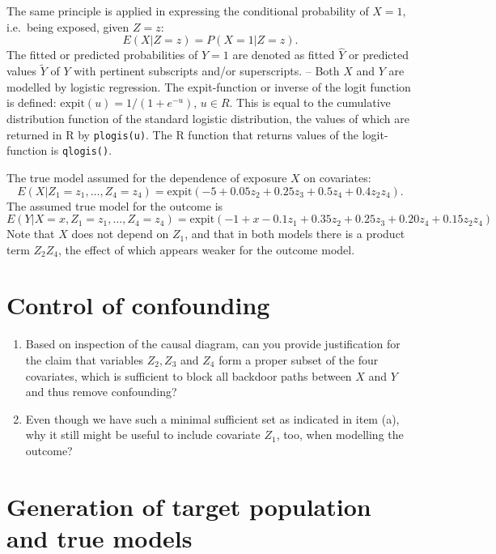 \documentclass[
]{book}
\begin{document}
The same principle is applied in expressing the conditional
probability of \(X=1\), i.e.~being exposed, given \(Z=z\):
\[ E(X|Z=z) = P(X=1|Z=z). \]
The fitted or predicted probabilities
of \(Y=1\) are denoted as fitted \(\widehat{Y}\) or predicted values
\(\widetilde{Y}\) of \(Y\) with pertinent subscripts and/or superscripts.
-- Both \(X\) and \(Y\) are modelled by logistic regression. The expit-function
or inverse of the logit function is defined:
\(\text{expit}(u) = 1/(1 + e^{-u})\), \(u\in R\). This is equal to the
cumulative distribution function of the standard logistic distribution,
the values of which are returned in R by \texttt{plogis(u)}. The R function
that returns values of the logit-function is \texttt{qlogis()}.

The true model assumed for the dependence of exposure \(X\) on covariates:
\[ E(X|Z_1 = z_1, \dots, Z_4 = z_4) =
      \text{expit}(-5 + 0.05z_2 + 0.25z_3 + 0.5z_4 + 0.4z_2z_4) . \] The
assumed true model for the outcome is
\[ E(Y|X=x, Z_1 = z_1, \dots, Z_4 = z_4) =
           \text{expit}(-1 + x - 0.1z_1 + 0.35z_2 + 0.25z_3 +
                 0.20z_4 + 0.15z_2z_4) \]
Note that \(X\) does not depend on \(Z_1\), and that in both models
there is a product term \(Z_2 Z_4\),
the effect of which appears weaker for the outcome model.

\section{Control of confounding}\label{control-of-confounding}

\begin{enumerate}
\def\labelenumi{\arabic{enumi}.}
\item
  Based on inspection of the causal diagram, can you provide
  justification for the claim that variables
  \(Z_2, Z_3\) and \(Z_4\) form
  a proper subset of the four covariates,
  which is sufficient to block all backdoor paths between \(X\)
  and \(Y\) and thus remove confounding?
\item
  Even though we have such a minimal sufficient set
  as indicated in item (a), why it still might be useful
  to include covariate
  \(Z_1\), too, when modelling the outcome?
\end{enumerate}

\section{Generation of target population and true models}\label{generation-of-target-population-and-true-models}
\end{document}
